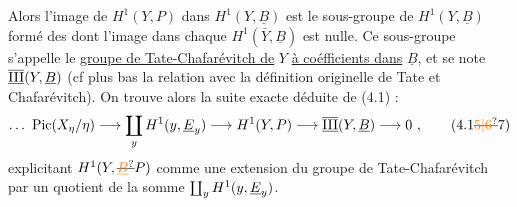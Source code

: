 
Alors l'image de $H^1(Y,P)$ dans $H^1(Y,\underline B)$ est le sous-groupe de $H^1(Y,\underline B)$ formé des  dont l'image dans chaque $H^1(\bar Y,\underline B)$ est nulle. Ce sous-groupe s'appelle le \uline{groupe de Tate-Chafarévitch de} $Y$ \uline{à coéfficients dans} $\underline B$, et se note $\overline{\underline{\mathrm{III}}}(Y,\underline B)$ (cf plus bas  la relation avec la définition originelle de Tate et Chafarévitch). On trouve alors la suite exacte déduite de (4.1) :
\[
\ldots\ \mathrm{Pic}(X_{\handwritten{\eta}}/\handwritten{\eta})\handwritten{\longrightarrow\coprod}_{y}H^1(y,\underline E_y)
\handwritten{\longrightarrow} H^1(Y,P)\handwritten{\longrightarrow\overline{\underline{\mathrm{III}}}}(Y,\underline B)\handwritten{\longrightarrow}0\ ,
\tag*{(4.1\deleted{\unsure{5|6}}\handwritten{7})}
\]
explicitant $H^1(Y,\deleted{\unsure{\underline B}}\handwritten P)$ comme une extension du groupe de Tate-Chafarévitch par un quotient de la somme $\coprod_yH^1(y,\underline E_y)$.

